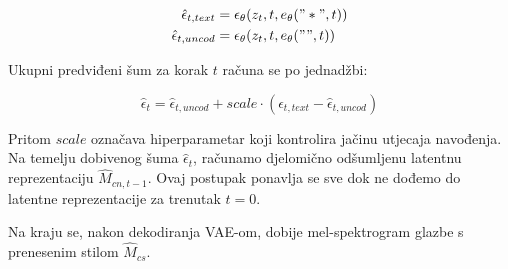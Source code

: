 \begin{align}
    \hat{\epsilon}_{t, text} &= \epsilon_\theta(z_t, t, e_\theta(\mathrm{"*"}, t)) \\
    \hat{\epsilon}_{t, uncod} &= \epsilon_\theta(z_t, t, e_\theta(\mathrm{""}, t))
\end{align}

Ukupni predviđeni šum za korak $t$ računa se po jednadžbi:

\begin{equation}
        \hat{\epsilon}_t = \hat{\epsilon}_{t, uncod} + scale \cdot ( \hat{\epsilon}_{t, text} -   \hat{\epsilon}_{t, uncod})
\end{equation}

Pritom $scale$ označava hiperparametar koji kontrolira jačinu utjecaja navođenja. Na temelju dobivenog šuma $\hat{\epsilon}_t$, računamo djelomično odšumljenu latentnu reprezentaciju $\hat{M}_{cn, t - 1}$. Ovaj postupak ponavlja se sve dok ne dođemo do latentne reprezentacije za trenutak $t = 0$.

Na kraju se, nakon dekodiranja VAE-om, dobije mel-spektrogram glazbe s prenesenim stilom $\hat{M}_{cs}$.
